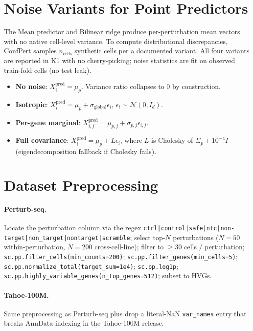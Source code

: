 \documentclass{article}
\begin{document}
\section{Noise Variants for Point Predictors}
\label{app:noise}

The Mean predictor and Bilinear ridge produce per-perturbation mean vectors with no native cell-level variance. To compute distributional discrepancies, ConfPert samples $n_{\text{cells}}$ synthetic cells per a documented variant. All four variants are reported in K1 with no cherry-picking; noise statistics are fit on observed train-fold cells (no test leak).

\begin{itemize}
\item[\textbf{A}] \textbf{No noise}: $X^{\text{pred}}_i = \mu_p$. Variance ratio collapses to 0 by construction.
\item[\textbf{B}] \textbf{Isotropic}: $X^{\text{pred}}_i = \mu_p + \sigma_{\text{global}} \epsilon_i$, $\epsilon_i \sim \mathcal{N}(0, I_d)$.
\item[\textbf{C}] \textbf{Per-gene marginal}: $X^{\text{pred}}_{i, j} = \mu_{p, j} + \sigma_{p, j} \epsilon_{i, j}$.
\item[\textbf{D}] \textbf{Full covariance}: $X^{\text{pred}}_i = \mu_p + L \epsilon_i$, where $L$ is Cholesky of $\Sigma_p + 10^{-4} I$ (eigendecomposition fallback if Cholesky fails).
\end{itemize}

\section{Dataset Preprocessing}
\label{app:datasets}

\paragraph{Perturb-seq.} Locate the perturbation column via the regex \texttt{ctrl|control|safe|ntc|non-target|non\_target|nontarget|scramble}; select top-$N$ perturbations ($N = 50$ within-perturbation, $N = 200$ cross-cell-line); filter to $\geq 30$ cells / perturbation; \texttt{sc.pp.filter\_cells(min\_counts=200)}; \texttt{sc.pp.filter\_genes(min\_cells=5)}; \texttt{sc.pp.normalize\_total(target\_sum=1e4)}; \texttt{sc.pp.log1p}; \texttt{sc.pp.highly\_variable\_genes(n\_top\_genes=512)}; subset to HVGs.

\paragraph{Tahoe-100M.} Same preprocessing as Perturb-seq plus drop a literal-NaN \texttt{var\_names} entry that breaks AnnData indexing in the Tahoe-100M release.
\end{document}
